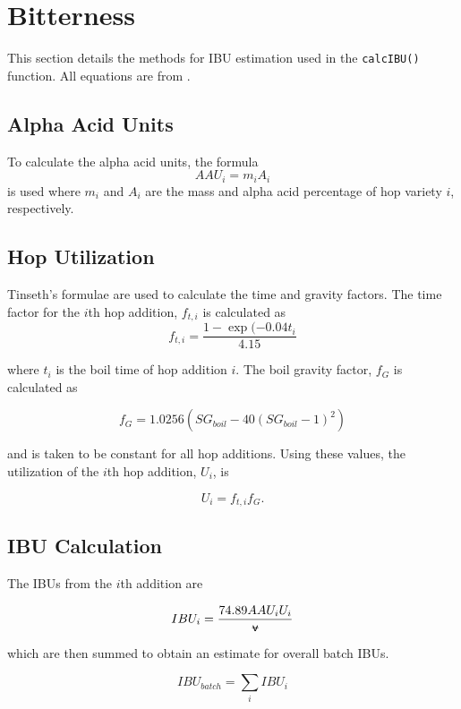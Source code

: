\documentclass[../main.tex]{subfiles}
\begin{document}
\section{Bitterness}
    This section details the methods for IBU estimation used in the \texttt{calcIBU()} function. All equations are from \cite{Palmer}.
    
    \subsection{Alpha Acid Units}
        To calculate the alpha acid units, the formula    
        \begin{equation}
            AAU_{i} = m_{i}A_{i}
        \end{equation}
        is used where $m_{i}$ and $A_{i}$ are the mass and alpha acid percentage of hop variety $i$, respectively.
    
    \subsection{Hop Utilization}
        Tinseth's formulae are used to calculate the time and gravity factors. The time factor for the $i$th hop addition, $f_{t,i}$ is calculated as
        \begin{equation}
            f_{t,i} = \frac{1-\exp(-0.04t_{i}}{4.15}
        \end{equation}
        
        where $t_{i}$ is the boil time of hop addition $i$. The boil gravity factor, $f_{G}$ is calculated as
        
        \begin{equation}
            f_{G} = 1.0256 \left( SG_{boil} - 40 (SG_{boil} - 1)^{2} \right)
        \end{equation}
        
        and is taken to be constant for all hop additions.  Using these values, the utilization of the $i$th hop addition, $U_{i}$, is
        
        \begin{equation}
            U_{i} = f_{t,i}f_{G}.
        \end{equation}
    
    \subsection{IBU Calculation}
        The IBUs from the $i$th addition are
        
        \begin{equation}
            IBU_{i} = \frac{74.89 AAU_{i} U_{i}}{\vol}
        \end{equation}
        
        which are then summed to obtain an estimate for overall batch IBUs.
        
        \begin{equation}
            IBU_{batch} = \sum_{i} IBU_{i}
        \end{equation}
\end{document}
